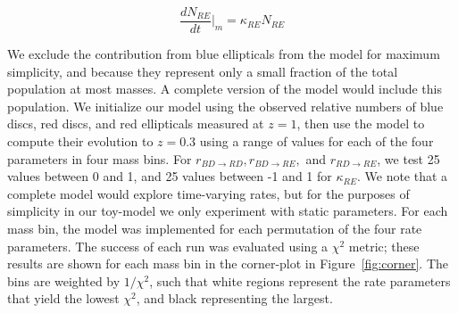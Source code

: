 \documentclass[useAMS,usenatbib]{mn2e}
\begin{document}
\begin{equation}
\frac{dN_{RE}}{dt}\Big\rvert_{m} = \kappa_{RE} N_{RE}  
\label{eqn:RE}
\end{equation}

We exclude the contribution from blue ellipticals from the model for maximum simplicity, and because they represent only a small fraction of the total population at most masses. A complete version of the model would include this population. We initialize our model using the observed relative numbers of blue discs, red discs, and red ellipticals measured at $z=1$, then use the model to compute their evolution to $z=0.3$ using a range of values for each of the four parameters in four mass bins. For $r_{BD \rightarrow RD}, r_{BD \rightarrow RE},$ and $r_{RD \rightarrow RE}$, we test 25 values between 0 and 1, and 25 values between -1 and 1 for $\kappa_{RE}$. We note that a complete model would explore time-varying rates, but for the purposes of simplicity in our toy-model we only experiment with static parameters. For each mass bin, the model was implemented for each permutation of the four rate parameters. The success of each run was evaluated using a $\chi^2$ metric; these results are shown for each mass bin in the corner-plot in Figure~\ref{fig:corner}. The bins are weighted by $1/\chi^2$, such that white regions represent the rate parameters that yield the lowest $\chi^2$, and black representing the largest.
\end{document}
